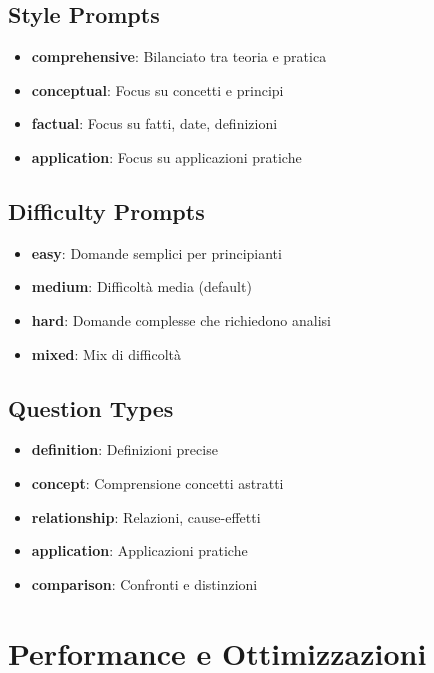 \documentclass[11pt,a4paper]{article}
\begin{document}
\subsection{Style Prompts}

\begin{itemize}
    \item \textbf{comprehensive}: Bilanciato tra teoria e pratica
    \item \textbf{conceptual}: Focus su concetti e principi
    \item \textbf{factual}: Focus su fatti, date, definizioni
    \item \textbf{application}: Focus su applicazioni pratiche
\end{itemize}

\subsection{Difficulty Prompts}

\begin{itemize}
    \item \textbf{easy}: Domande semplici per principianti
    \item \textbf{medium}: Difficoltà media (default)
    \item \textbf{hard}: Domande complesse che richiedono analisi
    \item \textbf{mixed}: Mix di difficoltà
\end{itemize}

\subsection{Question Types}

\begin{itemize}
    \item \textbf{definition}: Definizioni precise
    \item \textbf{concept}: Comprensione concetti astratti
    \item \textbf{relationship}: Relazioni, cause-effetti
    \item \textbf{application}: Applicazioni pratiche
    \item \textbf{comparison}: Confronti e distinzioni
\end{itemize}

\section{Performance e Ottimizzazioni}
\end{document}
